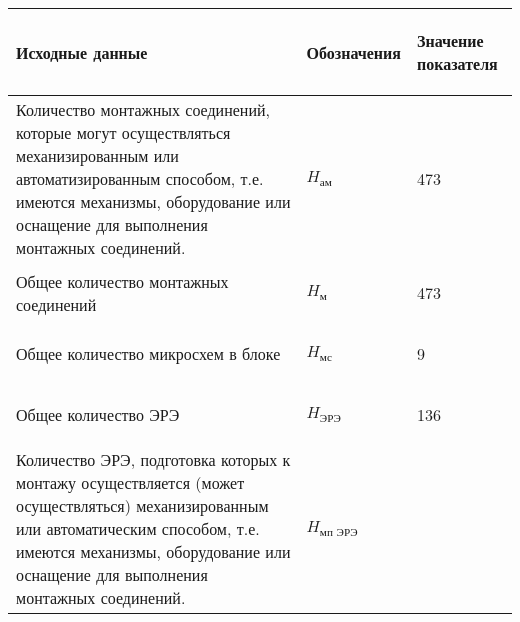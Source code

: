 \documentclass{article}
\begin{document}
\begin{table}
    \centering
    \begin{tabular}{|p{9cm}|p{3cm}|p{3cm}|}
        \hline
        \begin{center} Исходные данные \end{center}
        & \begin{center} Обозначения \end{center}
        & \begin{center} Значение показателя\end{center} \\
        \hline
        Количество монтажных соединений, которые могут осуществляться
        механизированным или автоматизированным способом,
        т.е. имеются механизмы, оборудование или оснащение для
        выполнения монтажных соединений.
        & \begin{center} $H_{\text{ам}}$\end{center}
        & \begin{center} 473 \end{center} \\
        \hline
        Общее количество монтажных соединений
        & \begin{center} $H_{\text{м}}$\end{center}
        & \begin{center} 473 \end{center} \\
        \hline
        Общее количество микросхем в блоке
        & \begin{center} $H_{\text{мс}}$\end{center}
        & \begin{center} 9 \end{center} \\
        \hline
        Общее количество ЭРЭ
        & \begin{center} $H_{\text{ЭРЭ}}$\end{center}
        & \begin{center} 136 \end{center} \\
        \hline
        Количество ЭРЭ, подготовка которых к монтажу осуществляется (может
        осуществляться) механизированным или автоматическим способом,
        т.е. имеются механизмы, оборудование или оснащение для выполнения
        монтажных соединений.
        & \begin{center} $H_{\text{мп ЭРЭ}}$ \end{center}

\end{tabular}
\end{table}
\end{document}
